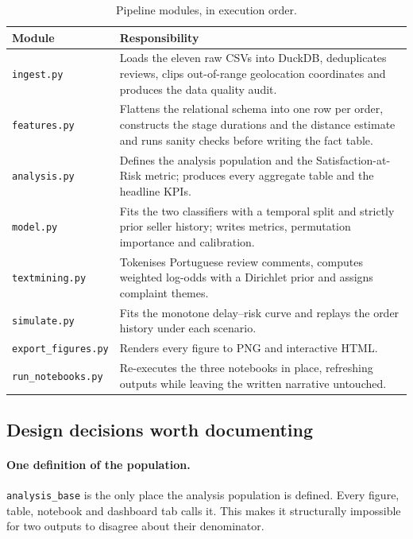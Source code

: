\documentclass[11pt,a4paper]{article}
\begin{document}
\begin{table}[H]
\centering
\small
\caption{Pipeline modules, in execution order.}
\label{tab:modules}
\begin{tabular}{@{}p{3.3cm}p{11.2cm}@{}}
\toprule
\textbf{Module} & \textbf{Responsibility}\\
\midrule
\texttt{ingest.py} & Loads the eleven raw CSVs into DuckDB, deduplicates reviews,
clips out-of-range geolocation coordinates and produces the data quality audit.\\
\texttt{features.py} & Flattens the relational schema into one row per order,
constructs the stage durations and the distance estimate and runs sanity checks
before writing the fact table.\\
\texttt{analysis.py} & Defines the analysis population and the Satisfaction-at-Risk
metric; produces every aggregate table and the headline KPIs.\\
\texttt{model.py} & Fits the two classifiers with a temporal split and strictly
prior seller history; writes metrics, permutation importance and calibration.\\
\texttt{textmining.py} & Tokenises Portuguese review comments, computes weighted
log-odds with a Dirichlet prior and assigns complaint themes.\\
\texttt{simulate.py} & Fits the monotone delay--risk curve and replays the order
history under each scenario.\\
\texttt{export\_figures.py} & Renders every figure to PNG and interactive HTML.\\
\texttt{run\_notebooks.py} & Re-executes the three notebooks in place, refreshing
outputs while leaving the written narrative untouched.\\
\bottomrule
\end{tabular}
\end{table}

\subsection{Design decisions worth documenting}

\paragraph{One definition of the population.} \texttt{analysis\_base} is the only
place the analysis population is defined. Every figure, table, notebook and
dashboard tab calls it. This makes it structurally impossible for two outputs to
disagree about their denominator.
\end{document}
